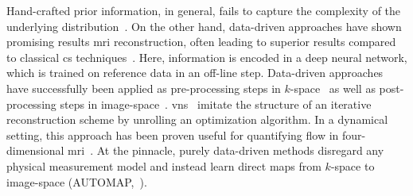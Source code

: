 \documentclass[twocolumn]{article}
\begin{document}
Hand-crafted prior information, in general, fails to capture the complexity of the underlying distribution~\cite{Huang1999StatisticsON}.
On the other hand, data-driven approaches have shown promising results \gls{mri} reconstruction, often leading to superior results compared to classical \gls{cs} techniques~\cite{hammernik_learning_2017,akcakaya_raki_2019,zbontar_fastmri_2018,putzky_irim_2019,zhou2020dudornet,Narnhofer2019,chung_scoremri_2022}.
Here, information is encoded in a deep neural network, which is trained on reference data in an off-line step.
Data-driven approaches have successfully been applied as pre-processing steps in \( k \)-space~\cite{akcakaya_raki_2019} as well as post-processing steps in image-space~\cite{zbontar_fastmri_2018}.
\Glspl{vn}~\cite{chen_tnrd_2017,hammernik_learning_2017,Kobler2017,cheng_pdnetworks_2019} imitate the structure of an iterative reconstruction scheme by unrolling an optimization algorithm.
In a dynamical setting, this approach has been proven useful for quantifying flow in four-dimensional \gls{mri}~\cite{Vishnevskiy2020}.
At the pinnacle, purely data-driven methods disregard any physical measurement model and instead learn direct maps from \( k \)-space to image-space (AUTOMAP,~\cite{zhu_image_2018}).
\end{document}
